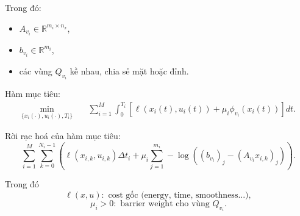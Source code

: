 \documentclass[12pt,a4paper]{article}
\begin{document}
Trong đó:
\begin{itemize}
    \item $A_{v_i} \in \mathbb{R}^{m_i \times n_x}$,
    \item $b_{v_i} \in \mathbb{R}^{m_i}$,
    \item các vùng $Q_{v_i}$ kề nhau, chia sẻ mặt hoặc đỉnh.
\end{itemize}

Hàm mục tiêu:
\[
\begin{aligned}
    \min_{\{x_i(\cdot),u_i(\cdot),T_i\}} \quad
    & \sum_{i=1}^{M} \int_{0}^{T_i}
    \left[\ell(x_i(t),u_i(t)) + \mu_i \phi_{v_i}(x_i(t))\right] dt.
\end{aligned}
\]

Rời rạc hoá của hàm mục tiêu:
\[
    \sum_{i=1}^{M}\sum_{k=0}^{N_i-1}
    \left(
        \ell(x_{i,k},u_{i,k})\Delta t_i
        + \mu_i \sum_{j=1}^{m_i} -\log\left((b_{v_i})_j - (A_{v_i}x_{i,k})_j\right)
    \right).
\]

Trong đó
\[
    \ell(x,u): \text{ cost gốc (energy, time, smoothness...)},
\]
\[
    \mu_i > 0: \text{ barrier weight cho vùng } Q_{v_i}.
\]
\end{document}
